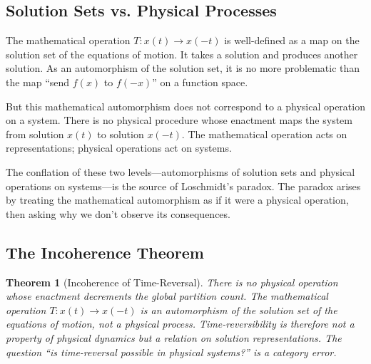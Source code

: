 \documentclass[twocolumn,10pt,a4paper]{article}
\newtheorem{theorem}{Theorem}[section]
\theoremstyle{definition}
\theoremstyle{remark}
\begin{document}
\subsection{Solution Sets vs. Physical Processes}

The mathematical operation $T: x(t) \to x(-t)$ is well-defined as a map on the solution set of the equations of motion. It takes a solution and produces another solution. As an automorphism of the solution set, it is no more problematic than the map ``send $f(x)$ to $f(-x)$'' on a function space.

But this mathematical automorphism does not correspond to a physical operation on a system. There is no physical procedure whose enactment maps the system from solution $x(t)$ to solution $x(-t)$. The mathematical operation acts on representations; physical operations act on systems.

The conflation of these two levels---automorphisms of solution sets and physical operations on systems---is the source of Loschmidt's paradox. The paradox arises by treating the mathematical automorphism as if it were a physical operation, then asking why we don't observe its consequences.

\subsection{The Incoherence Theorem}

\begin{theorem}[Incoherence of Time-Reversal]
\label{thm:incoherence}
There is no physical operation whose enactment decrements the global partition count. The mathematical operation $T: x(t) \to x(-t)$ is an automorphism of the solution set of the equations of motion, not a physical process. Time-reversibility is therefore not a property of physical dynamics but a relation on solution representations. The question ``is time-reversal possible in physical systems?'' is a category error.
\end{theorem}
\end{document}

